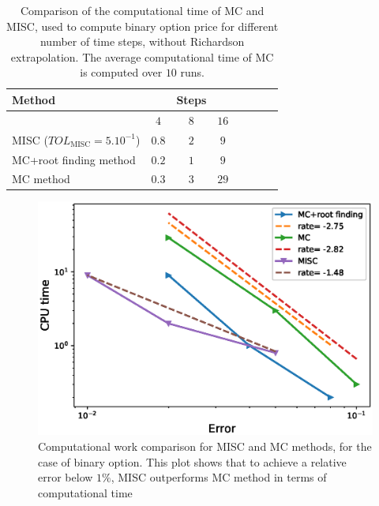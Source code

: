 \FloatBarrier

\begin{table}[h!]
	\centering
	\begin{tabular}{l*{6}{c}r}
		\toprule[1.5pt]
	Method & & Steps  &     \\
	\hline
		         & $4$ & $8$ & $16$ &   \\
		\hline
		MISC ($TOL_{\text{MISC}}=5.10^{-1}$)   & $0.8$ & $2$ & $9$  \\
		\hline
		MC+root finding method    & $0.2$ & $1$ & $9$  \\
		\hline 
		MC method    & $0.3$ & $3$ & $29$  \\
				\bottomrule[1.25pt]
	\end{tabular}
	\caption{Comparison of the computational time of  MC and MISC, used to compute binary option price  for different number of time steps, without Richardson extrapolation. The average computational time of MC is computed over $10$ runs.}
	\label{Comparsion of the computational time of  MC and MISC, used to compute Binary option price  for different number of time steps, without Richardson extrapolation}
\end{table}



\FloatBarrier
\begin{figure}[h!]
\centering
\includegraphics[width=0.4\linewidth]{./figures/Binary_Complexity_rates/error_vs_time}
	\caption{Computational work comparison for MISC and MC methods, for the case of binary  option. This plot shows that to achieve a relative error below $1\%$, MISC outperforms  MC method in terms of computational time}
	\label{fig:Complexity plot for MC and MISC , Binary, Non rich}
\end{figure}

